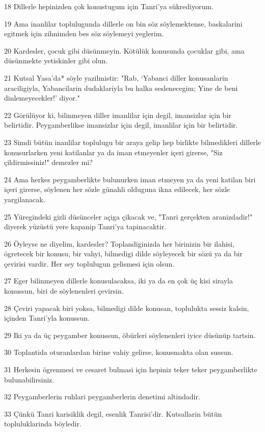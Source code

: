 \par 18 Dillerle hepinizden çok konustugum için Tanri'ya sükrediyorum.
\par 19 Ama inanlilar toplulugunda dillerle on bin söz söylemektense, baskalarini egitmek için zihnimden bes söz söylemeyi yeglerim.
\par 20 Kardesler, çocuk gibi düsünmeyin. Kötülük konusunda çocuklar gibi, ama düsünmekte yetiskinler gibi olun.
\par 21 Kutsal Yasa'da* söyle yazilmistir: "Rab, `Yabanci diller konusanlarin araciligiyla, Yabancilarin dudaklariyla bu halka seslenecegim; Yine de beni dinlemeyecekler!' diyor."
\par 22 Görülüyor ki, bilinmeyen diller imanlilar için degil, imansizlar için bir belirtidir. Peygamberlikse imansizlar için degil, imanlilar için bir belirtidir.
\par 23 Simdi bütün inanlilar toplulugu bir araya gelip hep birlikte bilmedikleri dillerle konusurlarken yeni katilanlar ya da iman etmeyenler içeri girerse, "Siz çildirmissiniz!" demezler mi?
\par 24 Ama herkes peygamberlikte bulunurken iman etmeyen ya da yeni katilan biri içeri girerse, söylenen her sözle günahli olduguna ikna edilecek, her sözle yargilanacak.
\par 25 Yüregindeki gizli düsünceler açiga çikacak ve, "Tanri gerçekten aranizdadir!" diyerek yüzüstü yere kapanip Tanri'ya tapinacaktir.
\par 26 Öyleyse ne diyelim, kardesler? Toplandiginizda her birinizin bir ilahisi, ögretecek bir konusu, bir vahyi, bilmedigi dilde söyleyecek bir sözü ya da bir çevirisi vardir. Her sey toplulugun gelismesi için olsun.
\par 27 Eger bilinmeyen dillerle konusulacaksa, iki ya da en çok üç kisi sirayla konussun, biri de söylenenleri çevirsin.
\par 28 Çeviri yapacak biri yoksa, bilmedigi dilde konusan, toplulukta sessiz kalsin, içinden Tanri'yla konussun.
\par 29 Iki ya da üç peygamber konussun, öbürleri söylenenleri iyice düsünüp tartsin.
\par 30 Toplantida oturanlardan birine vahiy gelirse, konusmakta olan sussun.
\par 31 Herkesin ögrenmesi ve cesaret bulmasi için hepiniz teker teker peygamberlikte bulunabilirsiniz.
\par 32 Peygamberlerin ruhlari peygamberlerin denetimi altindadir.
\par 33 Çünkü Tanri karisiklik degil, esenlik Tanrisi'dir. Kutsallarin bütün topluluklarinda böyledir.
